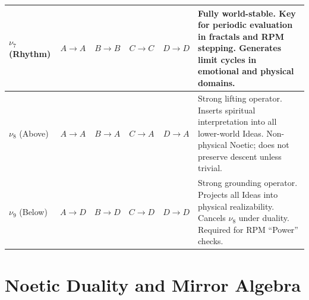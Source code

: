 \begin{longtable}{p{1.5cm}|c|c|c|c|p{4.5cm}}
$\nu_7$ (Rhythm)
& $A \to A$
& $B \to B$
& $C \to C$
& $D \to D$
& Fully world-stable.
Key for periodic evaluation in fractals and RPM stepping.
Generates limit cycles in emotional and physical domains.
\\
\midrule

$\nu_8$ (Above)
& $A \to A$
& $B \to A$
& $C \to A$
& $D \to A$
& Strong lifting operator.
Inserts spiritual interpretation into all lower-world Ideas.
Non-physical Noetic; does not preserve descent unless trivial.
\\
\midrule

$\nu_9$ (Below)
& $A \to D$
& $B \to D$
& $C \to D$
& $D \to D$
& Strong grounding operator.
Projects all Ideas into physical realizability.
Cancels $\nu_8$ under duality.
Required for RPM ``Power'' checks.
\\

\end{longtable}
\normalsize

\section{Noetic Duality and Mirror Algebra}

